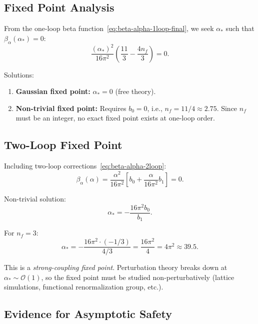 \documentclass[11pt,a4paper]{article}
\numberwithin{equation}{section}
\theoremstyle{plain}
\theoremstyle{definition}
\theoremstyle{remark}
\begin{document}
\subsection{Fixed Point Analysis}

From the one-loop beta function~\eqref{eq:beta-alpha-1loop-final}, we seek $\alpha_*$ such that $\beta_\alpha(\alpha_*)=0$:
\begin{equation}
\frac{(\alpha_*)^2}{16\pi^2}\left(\frac{11}{3} - \frac{4n_f}{3}\right) = 0.
\label{eq:fixed-point-eqn}
\end{equation}

Solutions:
\begin{enumerate}
  \item \textbf{Gaussian fixed point:} $\alpha_*=0$ (free theory).
  \item \textbf{Non-trivial fixed point:} Requires $b_0=0$, i.e., $n_f = 11/4 \approx 2.75$. Since $n_f$ must be an integer, no exact fixed point exists at one-loop order.
\end{enumerate}

\subsection{Two-Loop Fixed Point}

Including two-loop corrections~\eqref{eq:beta-alpha-2loop}:
\begin{equation}
\beta_\alpha(\alpha) = \frac{\alpha^2}{16\pi^2}\left[b_0 + \frac{\alpha}{16\pi^2}b_1\right] = 0.
\label{eq:beta-2loop-fixed}
\end{equation}

Non-trivial solution:
\begin{equation}
\alpha_* = -\frac{16\pi^2 b_0}{b_1}.
\label{eq:alpha-star-2loop}
\end{equation}

For $n_f=3$:
\begin{equation}
\alpha_* = -\frac{16\pi^2\cdot(-1/3)}{4/3} = \frac{16\pi^2}{4} = 4\pi^2 \approx 39.5.
\label{eq:alpha-star-nf3}
\end{equation}

This is a \emph{strong-coupling fixed point}. Perturbation theory breaks down at $\alpha_*\sim \mathcal{O}(1)$, so the fixed point must be studied non-perturbatively (lattice simulations, functional renormalization group, etc.).

\subsection{Evidence for Asymptotic Safety}
\end{document}
